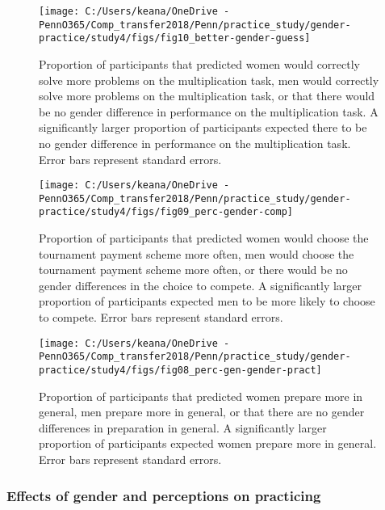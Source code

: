 \documentclass[letterpaper, nobind]{templates/ociamthesis}
\begin{document}
\begin{figure}

{\centering \texttt{[image: C:/Users/keana/OneDrive - PennO365/Comp\_transfer2018/Penn/practice\_study/gender-practice/study4/figs/fig10\_better-gender-guess]} 

}

\caption{Proportion of participants that predicted women would correctly solve more problems on the multiplication task, men would correctly solve more problems on the multiplication task, or that there would be no gender difference in performance on the multiplication task. A significantly larger proportion of participants expected there to be no gender difference in performance on the multiplication task. Error bars represent standard errors.}\label{fig:s304}
\end{figure}

\begin{figure}

{\centering \texttt{[image: C:/Users/keana/OneDrive - PennO365/Comp\_transfer2018/Penn/practice\_study/gender-practice/study4/figs/fig09\_perc-gender-comp]} 

}

\caption{Proportion of participants that predicted women would choose the tournament payment scheme more often, men would choose the tournament payment scheme more often, or there would be no gender differences in the choice to compete. A significantly larger proportion of participants expected men to be more likely to choose to compete. Error bars represent standard errors.}\label{fig:s305}
\end{figure}

\begin{figure}

{\centering \texttt{[image: C:/Users/keana/OneDrive - PennO365/Comp\_transfer2018/Penn/practice\_study/gender-practice/study4/figs/fig08\_perc-gen-gender-pract]} 

}

\caption{Proportion of participants that predicted women prepare more in general, men prepare more in general, or that there are no gender differences in preparation in general. A significantly larger proportion of participants expected women prepare more in general. Error bars represent standard errors.}\label{fig:s306}
\end{figure}

\hypertarget{effects-of-gender-and-perceptions-on-practicing-3}{%
\subsubsection{Effects of gender and perceptions on practicing}\label{effects-of-gender-and-perceptions-on-practicing-3}}
\end{document}
